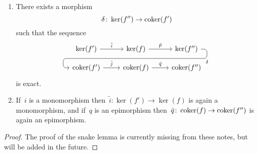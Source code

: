 \begin{lemma}
  \begin{enumerate}
    \item
      There exists a morphism
      \[
                \delta
        \colon  \ker(f'')
        \to     \operatorname{coker}(f')
      \]
      such that the sequence
      \begin{equation}
        \label{induced snake}
        \begin{tikzcd}[row sep = small]
            \ker(f')
            \arrow{r}[above]{\tilde{i}}
          & \ker(f)
            \arrow{r}[above]{\tilde{p}}
            \arrow[d, phantom, ""{coordinate, name=Z}]
          & \ker(f'')
            \arrow[ dll,
                    "\delta",
                    rounded corners,
                    to path={ -- ([xshift=2ex]\tikztostart.east)
                              |- (Z) \tikztonodes
                              -| ([xshift=-2ex]\tikztotarget.west)
                              -- (\tikztotarget)}
                  ]
          \\
            \coker(f')
            \arrow{r}[above]{\bar{j}}
          & \coker(f)
            \arrow{r}[above]{\bar{q}}
          & \coker(f'')
        \end{tikzcd}
      \end{equation}
      is exact.
    \item
      \label{snake inherits mono epi}
      If~$i$ is a monomorphism then~$\tilde{i} \colon \ker(f') \to \ker(f)$ is again a monomorphism, and if~$q$ is an epimorphism then~$\bar{q} \colon \operatorname{coker}(f) \to \operatorname{coker}(f'')$ is again an epimorphism.
  \end{enumerate}
\end{lemma}


\begin{proof}
  The proof of the snake lemma is currently missing from these notes, but will be added in the future.
\end{proof}


